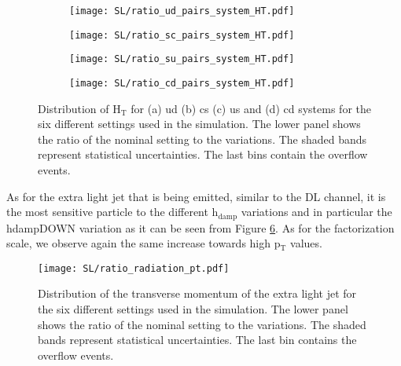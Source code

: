 \begin{figure}[H]
    \centering
    \begin{subfigure}{0.49\textwidth}
        \centering
        \texttt{[image: SL/ratio\_ud\_pairs\_system\_HT.pdf]}
        \caption{}
        \label{subfig:HT(ud)_SL}        
    \end{subfigure}
    \hfill
    \begin{subfigure}{0.49\textwidth}
        \centering
        \texttt{[image: SL/ratio\_sc\_pairs\_system\_HT.pdf]}
        \caption{}
        \label{subfig:HT(cs)_SL}        
    \end{subfigure}
    \hfill
        \begin{subfigure}{0.49\textwidth}
        \centering
        \texttt{[image: SL/ratio\_su\_pairs\_system\_HT.pdf]}
        \caption{}
        \label{subfig:HT(us)_SL}        
    \end{subfigure}
    \hfill
    \begin{subfigure}{0.49\textwidth}
        \centering
        \texttt{[image: SL/ratio\_cd\_pairs\_system\_HT.pdf]}
        \caption{}
        \label{subfig:HT(cd)_SL}        
    \end{subfigure}
    \caption{Distribution of H$_{\text{T}}$ for (a) ud (b) cs (c) us and (d) cd systems for the six different settings used in the simulation. The lower panel shows the ratio of the nominal setting to the variations. The shaded bands represent statistical uncertainties. The last bins contain the overflow events.}
    \label{fig:quarks_SL}
\end{figure}
\indent As for the extra light jet that is being emitted, similar to the DL channel, it is the most sensitive particle to the different h$_{\text{damp}}$ variations and in particular the hdampDOWN variation as it can be seen from Figure \ref{fig:radiation_SL}. As for the factorization scale, we observe again the same increase towards high p$_{\text{T}}$ values.
\begin{figure}[H]
    \centering
    \texttt{[image: SL/ratio\_radiation\_pt.pdf]}
    \caption{Distribution of the transverse momentum of the extra light jet for the six different settings used in the simulation. The lower panel shows the ratio of the nominal setting to the variations. The shaded bands represent statistical uncertainties. The last bin contains the overflow events.}
    \label{fig:radiation_SL}
\end{figure}

